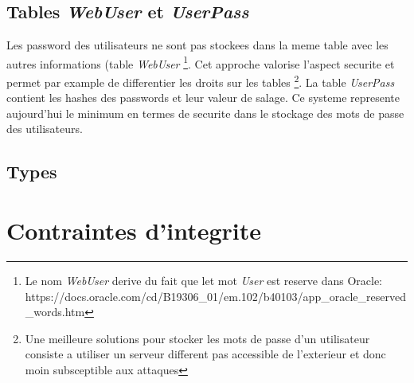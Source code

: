 \documentclass[twoside,openright,a4paper,11pt,french]{article}
\begin{document}
\subsection{Tables {\it WebUser} et {\it UserPass}}

Les password des utilisateurs ne sont pas stockees dans la meme table avec les
autres informations (table {\it WebUser}
\footnote{Le nom {\it WebUser} derive du fait que let mot {\it User} est reserve dans Oracle:
https://docs.oracle.com/cd/B19306\_01/em.102/b40103/app\_oracle\_reserved\_words.htm}.
Cet approche valorise l'aspect securite et permet par
example de differentier les droits sur les tables
\footnote{Une meilleure solutions pour stocker les mots de passe d'un
utilisateur consiste a utiliser un serveur different pas accessible de
l'exterieur et donc  moin subsceptible aux attaques}.
La table {\it UserPass} contient les hashes des passwords et leur valeur de
salage.  Ce systeme represente aujourd'hui le minimum en termes de securite
dans le stockage des mots de passe des utilisateurs.


\subsection{Types}


\section{Contraintes d'integrite}


\end{document}

